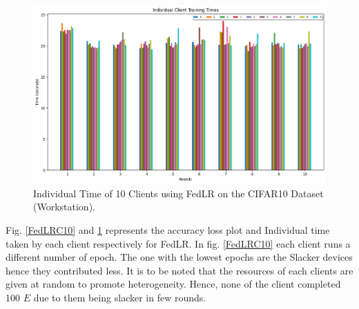 \documentclass[conference]{IEEEtran}
\begin{document}
\begin{figure}[htp!]
	\centering
	\includegraphics[scale=.3]{Images/Result Images/CIFAR 10/cifar10_total_time_589o74 }
	\caption{Individual Time of 10 Clients using FedLR on the CIFAR10 Dataset (Workstation).}
	\label{FedLRTimeC10}
\end{figure}
Fig. \ref{FedLRC10} and \ref{FedLRTimeC10} represents the accuracy loss plot and Individual time taken by each client respectively for FedLR. In fig. \ref{FedLRC10} each client runs a different number of epoch. The one with the lowest epochs are the Slacker devices hence they contributed less. It is to be noted that the resources of each clients are given at random to promote heterogeneity. Hence, none of the client completed 100 $E$ due to them being slacker in few rounds.
\end{document}
